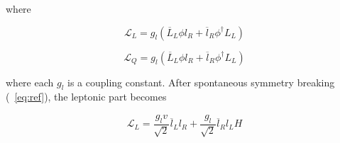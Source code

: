 where

\begin{equation}
	\mathcal{L}_{L}= g_{l}(\overline{L}_{L}\phi l_{R} + \overline{l}_{R} \phi^{\dagger} L_{L}) 
	\label{eq:SSB1}
\end{equation}

\begin{equation}
	\mathcal{L}_{Q}= g_{l}(\overline{L}_{L}\phi l_{R} + \overline{l}_{R} \phi^{\dagger} L_{L}) 
	\label{eq:SSB2}
\end{equation}



where each $g_{l}$ is a coupling constant. After spontaneous symmetry breaking (~\autoref{eq:ref}), the leptonic part becomes

\begin{equation}
	\mathcal{L}_{L}= \frac{g_{l}v}{\sqrt{2}}\overline{l}_{L}l_{R} + \frac{g_{l}}{\sqrt{2}}\overline{l}_{R} l_{L}H
        \label{eq:SSB1}
\end{equation}

